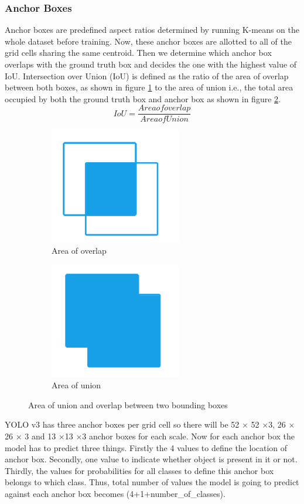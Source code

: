 \subsubsection*{Anchor Boxes}
Anchor boxes are predefined aspect ratios determined by running K-means on the whole dataset before training. Now, these anchor boxes are allotted to all of the grid cells sharing the same centroid. Then we determine which anchor box overlaps with the ground truth box and decides the one with the highest value of IoU. Intersection over Union (IoU) is defined as the ratio of the area of overlap between both boxes, as shown in figure \ref{fig:5.4a} to the area of union i.e., the total area occupied by both the ground truth box and anchor box as shown in figure \ref{fig:5.4b}.
\begin{equation}
    IoU = \frac{Area of overlap}{Area of Union}
\end{equation}

  \begin{figure}[H]
  \centering
  \begin{subfigure}[t]{0.3\textwidth}
      \includegraphics[scale = 0.7]{CHAPTERS/Chapter-5/images/5.4a.PNG}
      \caption{Area of overlap}
      \label{fig:5.4a}
  \end{subfigure}
  \begin{subfigure}[t]{0.3\textwidth}
      \includegraphics[scale = 0.7]{CHAPTERS/Chapter-5/images/5.4b.PNG}
      \caption{Area of union}
      \label{fig:5.4b}
  \end{subfigure}
  \caption[]{Area of union and overlap between two bounding boxes}
  \label{fig:11.4}
\end{figure}
YOLO v3 has three anchor boxes per grid cell so there will be 52 $\times$ 52 $\times$3, 26 $\times$ 26 $\times$ 3 and 13 $\times$13 $\times$3 anchor boxes for each scale. Now for each anchor box the model has to predict three things. Firstly the 4 values to define the location of anchor box. Secondly, one value to indicate whether object is present in it or not. Thirdly, the values for probabilities  for all classes to define this anchor box belongs to which class. Thus, total number of values the model is going to predict against each anchor box becomes (4+1+number\_of\_classes). 

